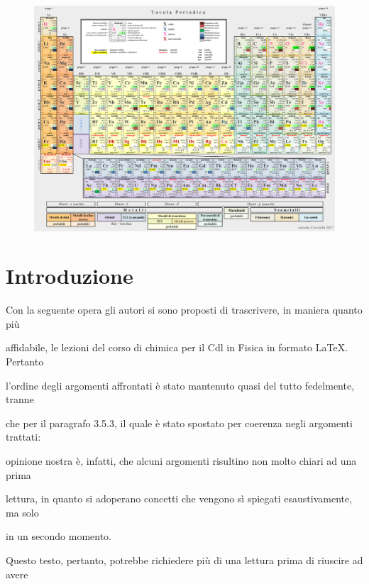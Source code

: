 \documentclass[openany,12pt]{book}%
\newcommand\blankpage{%
    \null
    \thispagestyle{empty}%
    \newpage}
\begin{document}
\begin{figure}[H]
    \includegraphics[angle=90,origin=c]{immagini/tavola periodica.png}
\end{figure}

\afterpage{\blankpage}

\frontmatter

\tableofcontents

\thispagestyle{empty}
\chapter*{Introduzione}

Con la seguente opera gli autori si sono proposti di trascrivere, in maniera quanto più

affidabile, le lezioni del corso di chimica per il Cdl in Fisica in formato \LaTeX. Pertanto

l'ordine degli argomenti affrontati è stato mantenuto quasi del tutto fedelmente, tranne

che per il paragrafo 3.5.3, il quale è stato spostato per coerenza negli argomenti trattati:

opinione nostra è, infatti, che alcuni argomenti risultino non molto chiari ad una prima

lettura, in quanto si adoperano concetti che vengono sì spiegati esaustivamente, ma solo

in un secondo momento.

\vspace{0.2cm}
Questo testo, pertanto, potrebbe richiedere più di una lettura prima di riuscire ad avere
\end{document}

